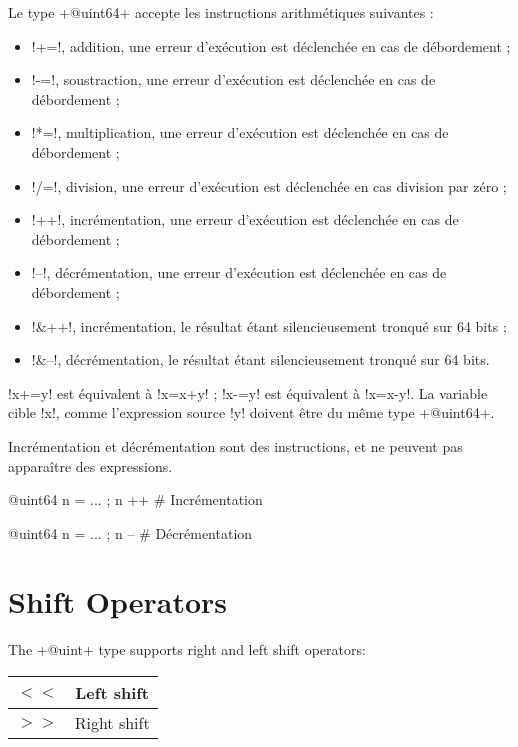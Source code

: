Le type \ggst+@uint64+ accepte les instructions arithmétiques suivantes :
\begin{itemize}
  \item \ggst!+=!, addition, une erreur d'exécution est déclenchée en cas de débordement ;
  \item \ggst!-=!, soustraction, une erreur d'exécution est déclenchée en cas de débordement ;
  \item \ggst!*=!, multiplication, une erreur d'exécution est déclenchée en cas de débordement ;
  \item \ggst!/=!, division, une erreur d'exécution est déclenchée en cas division par zéro ;
  \item \ggst!++!, incrémentation, une erreur d'exécution est déclenchée en cas de débordement ;
  \item \ggst!--!, décrémentation, une erreur d'exécution est déclenchée en cas de débordement ;
  \item \ggst!&++!, incrémentation, le résultat étant silencieusement tronqué sur 64 bits ;
  \item \ggst!&--!, décrémentation, le résultat étant silencieusement tronqué sur 64 bits.
\end{itemize}

\ggst!x+=y! est équivalent à \ggst!x=x+y! ; \ggst!x-=y! est équivalent à \ggst!x=x-y!.
La variable cible \ggst!x!, comme l'expression source \ggst!y! doivent être du même type \ggst+@uint64+.

Incrémentation et décrémentation sont des instructions, et ne peuvent pas apparaître des expressions.
\begin{galgas3}
@uint64 n = ... ; n ++ # Incrémentation
\end{galgas3}

\begin{galgas3}
@uint64 n = ... ; n -- # Décrémentation
\end{galgas3}


\section{Shift Operators}


The \ggst+@uint+ type supports right and left shift operators:\newline

\begin{tabular}{|c|c|}
\hline
$<<$ & Left shift \\
\hline
$>>$ & Right shift \\
\hline
\end{tabular}

